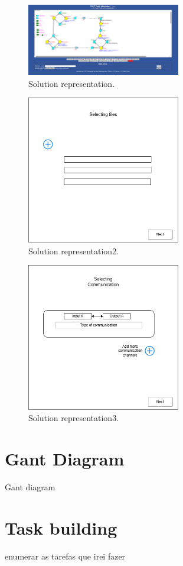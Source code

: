 \begin{figure}[htbp]
  \centering
  \includegraphics[width=0.6\textwidth]{Chapters/Figures/butao.png}
  \caption{Solution representation.}
  \label{fig:butao}
\end{figure}
\begin{figure}[htbp]
  \centering
  \includegraphics[width=0.6\textwidth]{Chapters/Figures/11.png}
  \caption{Solution representation2.}
  \label{fig:11}
\end{figure}
\begin{figure}[htbp]
  \centering
  \includegraphics[width=0.6\textwidth]{Chapters/Figures/12.png}
  \caption{Solution representation3.}
  \label{fig:12}
\end{figure}
 
 
 
 
 
 
\section{Gant Diagram }
\label{sec:gant_diagram}

Gant diagram

\section{Task building}
\label{sec:task_building}

enumerar as tarefas que irei fazer
